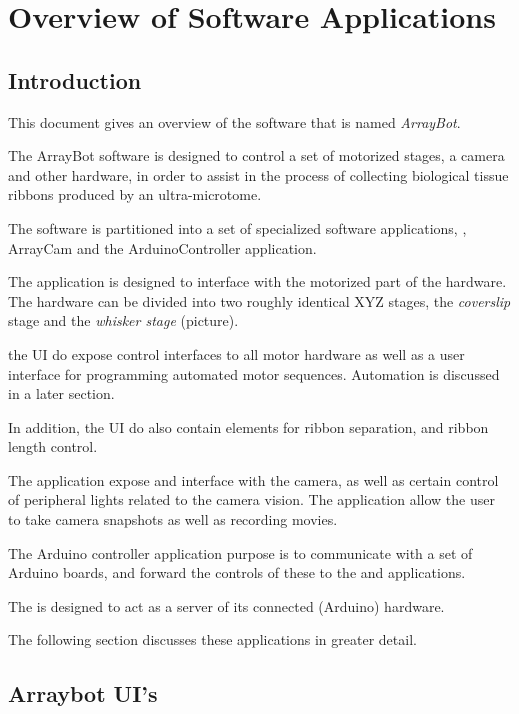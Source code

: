 \documentclass[11pt,fleqn]{book} %
\begin{document}

\chapter{Overview of \ab{} Software Applications}

\section{Introduction}

\doublespacing
This document gives an overview of the software that is named \emph{ArrayBot}.

The ArrayBot software is designed to control a set of motorized stages, a camera and other hardware, in order to assist in the process of collecting biological tissue ribbons produced by an ultra-microtome.

The \ab{} software is partitioned into a set of specialized software applications, \ab{}, ArrayCam and the ArduinoController application.

The \ab{} application is designed to interface with the motorized part of the \ab{} hardware. The hardware can be divided into two roughly identical XYZ stages, the \emph{coverslip} stage and the \emph{whisker stage} (picture). 

the \ab{} UI do expose control interfaces to all motor hardware as well as a user interface for programming automated motor sequences. Automation is discussed in a later section.

In addition, the UI do also contain elements for ribbon separation, and ribbon length control.

The \ac{} application expose and interface with the \ab{} camera, as well as certain control of peripheral lights related to the camera vision. The \ac{} application allow the user to take camera snapshots as well as recording movies.

The Arduino controller application purpose is to communicate with a set of Arduino boards, and forward the controls of these to the \ab{} and \ac{} applications.

The \abc{} is designed to act as a server of its connected (Arduino) hardware.

The following section discusses these applications in greater detail.

\clearpage

\section{Arraybot UI's}
\end{document}
